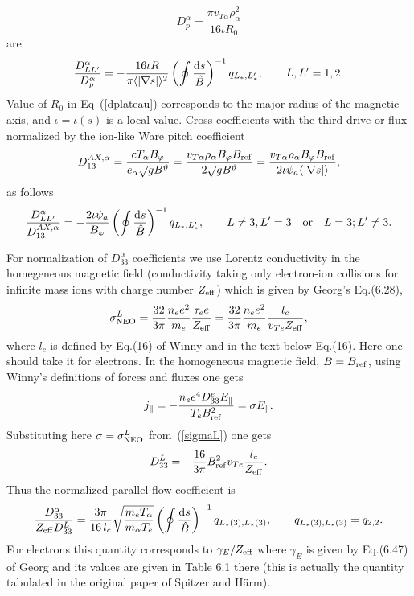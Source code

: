 \documentclass[preprint,prb,aps]{revtex4-1}
\newcommand{\red}[1]{{\color{red} #1}}
\newcommand{\be}[1]{\begin{equation} \label{#1}}
\newcommand{\ee}{\end{equation}}
\newcommand{\eq}[1]{(\ref{#1})}
\newcommand{\rd}{{\rm d}}
\begin{document}
\be{dplateau}
D_p^\alpha = \frac{\pi v_{T\alpha} \rho_\alpha^2}{16\iota R_0}
\ee
are
\be{platnorm}
\frac{D_{LL^\prime}^\alpha}{D_p^\alpha}=-\frac{16\iota R}{\pi\langle|\nabla s|\rangle^2}
\left(\oint \frac{\rd s}{\hat B}\right)^{-1}
q_{L_\ast,L_\ast^\prime}, \qquad L,L^\prime=1,2.
\ee
\red{
Value of $R_0$ in Eq~\eq{dplateau} corresponds to the major radius of the magnetic axis,
and $\iota=\iota(s)$ is a local value.
}
Cross coefficients with the third drive or flux normalized by the ion-like Ware pitch coefficient
\red{
\be{wareion}
D_{13}^{AX,\alpha}=\frac{c T_\alpha B_\varphi}{e_\alpha \sqrt{g}B^\vartheta}
=\frac{v_{T\alpha}\rho_\alpha B_\varphi B_{\rm ref}}{2\sqrt{g}B^\vartheta}
=\frac{v_{T\alpha}\rho_\alpha B_\varphi B_{\rm ref}}{2\iota \psi_a \langle|\nabla s|\rangle},
\ee
as follows
\be{warenorm}
\frac{D_{LL^\prime}^\alpha}{D_{13}^{AX,\alpha}}=-\frac{2\iota \psi_a}{B_\varphi}
\left(\oint \frac{\rd s}{\hat B}\right)^{-1}
q_{L_\ast,L_\ast^\prime}, \qquad L\ne 3, L^\prime=3 \quad\mbox{or}\quad L=3; L^\prime \ne 3.
\ee
}

\noindent
For normalization of $D_{33}^\alpha$ coefficients we use Lorentz conductivity in the homegeneous magnetic field
(conductivity taking only electron-ion collisions for infinite mass ions with charge number $Z_{\rm eff}$)
which is given by Georg's Eq.(6.28),
\be{sigmaL}
\sigma^L_{\rm NEO}=\frac{32}{3\pi}\frac{n_e e^2}{m_e}\frac{\tau_ee}{Z_{\rm eff}}=
\frac{32}{3\pi}\frac{n_e e^2}{m_e}\frac{l_c}{v_{Te}Z_{\rm eff}},
\ee
where $l_c$ is defined by Eq.(16) of Winny and in the text below Eq.(16). Here one should take it for electrons.
In the homogeneous magnetic field, $B=B_{\rm ref}$, using Winny's definitions of forces and fluxes one gets
$$
j_\parallel = -\frac{n_e e^4 D_{33}^e E_\parallel}{T_e B^2_{\rm ref}}=\sigma E_\parallel.
$$
Substituting here $\sigma = \sigma^L_{\rm NEO}$ from~\eq{sigmaL} one gets
\be{D33L}
D_{33}^{L}=-\frac{16}{3\pi} B^2_{\rm ref} v_{Te} \frac{l_c}{Z_{\rm eff}}.
\ee
Thus the normalized parallel flow coefficient is
\be{D33norm}
\frac{D^\alpha_{33}}{Z_{\rm eff} D_{33}^{L}}=\frac{3\pi}{16\, l_c} \sqrt{\frac{m_e T_\alpha}{m_\alpha T_e}}
\left(\oint \frac{\rd s}{\hat B}\right)^{-1}q_{L_\ast(3),L_\ast(3)},
\qquad q_{L_\ast(3),L_\ast(3)}=q_{2,2}.
\ee
For electrons this quantity corresponds to $\gamma_E / Z_{\rm eff}$ where $\gamma_E$ is given by Eq.(6.47) of Georg
and its values are given in Table 6.1 there (this is actually the quantity tabulated in the original paper of
Spitzer and H\"arm).

\end{document}
